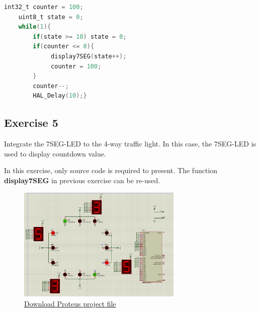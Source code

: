 \documentclass[twoside, final]{hcmut_report}
\begin{document}
\begin{lstlisting}[language=C, caption=Source code for Exercise 4]
    int32_t counter = 100;
	uint8_t state = 0;
    while(1){
        if(state >= 10) state = 0;
	  	if(counter <= 0){
		  	 display7SEG(state++);
		  	 counter = 100;
	  	}
	  	counter--;
	  	HAL_Delay(10);}
\end{lstlisting}

\subsection{Exercise 5}

Integrate the 7SEG-LED to the 4-way traffic light. In this case, the 7SEG-LED is used to display countdown value.

In this exercise, only source code is required to present. The function \textbf{display7SEG} in previous exercise can be re-used.

\begin{figure}[ht]
    \centering
    \includegraphics[width=0.7\textwidth]{graphics/f6.png}
    \caption{
        \href{https://github.com/batmaon512/Microcontroller-251/blob/main/Lab/Lab1_LED_Animations/Source_Proteus/EX5.pdsprj}{Download Proteus project file}
    }
\end{figure}
\end{document}
